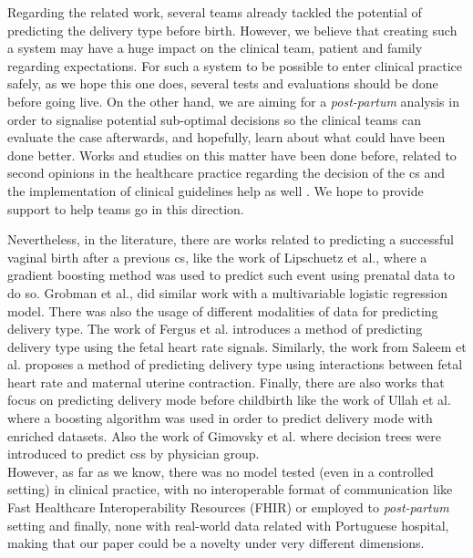 Regarding the related work, several teams already tackled the potential of predicting the delivery type before birth. However, we believe that creating such a system may have a huge impact on the clinical team, patient and family regarding expectations. For such a system to be possible to enter clinical practice safely, as we hope this one does, several tests and evaluations should be done before going live.
On the other hand, we are aiming for a \textit{post-partum} analysis in order to signalise potential sub-optimal decisions so the clinical teams can evaluate the case afterwards, and hopefully, learn about what could have been done better.
Works and studies on this matter have been done before, related to second opinions in the healthcare practice regarding the decision of the \ac{cs} \cite{mandatorysecondopinion} and the implementation of clinical guidelines help as well \cite{reducingcaeresan}. We hope to provide support to help teams go in this direction.

Nevertheless, in the literature, there are works related to predicting a successful vaginal birth after a previous \ac{cs}, like the work of Lipschuetz et al., \cite{lipschuetzPredictionVaginalBirth2020} where a gradient boosting method was used to predict such event using prenatal data to do so. Grobman et al., \cite{grobman_development_2007} did similar work with a multivariable logistic regression model.
There was also the usage of different modalities of data for predicting delivery type. The work of Fergus et al. \cite{fergusClassificationCaesareanSection2017} introduces a method of predicting delivery type using the fetal heart rate signals. Similarly, the work from Saleem et al. \cite{saleemStrategyClassificationVaginal2019a} proposes a method of predicting delivery type using interactions between fetal heart rate and maternal uterine contraction.
Finally, there are also works that focus on predicting delivery mode before childbirth like the work of Ullah et al. \cite{ullah_reliable_2021} where a boosting algorithm was used in order to predict delivery mode with enriched datasets. Also the work of Gimovsky et al.  \cite{gimovskyBenchmarkingCesareanDelivery} where decision trees were introduced  to predict \acp{cs} by physician group. \\
However, as far as we know, there was no model tested (even in a controlled setting) in clinical practice, with no interoperable format of communication like Fast Healthcare Interoperability Resources (FHIR) or employed to \textit{post-partum} setting and finally, none with real-world data related with Portuguese hospital, making that our paper could be a novelty under very different dimensions.



